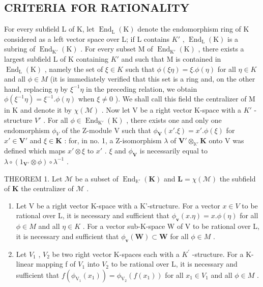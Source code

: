 \subsection{CRITERIA FOR RATIONALITY}

For every subfield L of K, let \(\operatorname{End}_{\mathrm{L}}(\mathrm{K})\) denote the endomorphism ring of K considered as a left vector space over L; if L contains \(K'\) , \(\operatorname{End}_{\mathrm{L}}(\mathrm{K})\) is a subring of \(\operatorname{End}_{\mathrm{K}'}(\mathrm{K})\) . For every subset M of \(\operatorname{End}_{\mathrm{K}'}(\mathrm{K})\) , there exists a largest subfield L of K containing \(K'\) and such that M is contained in \(\operatorname{End}_{\mathrm{L}}(\mathrm{K})\) , namely the set of \(\xi \in K\) such that \(\phi(\xi\eta) = \xi.\phi(\eta)\) for all \(\eta \in K\) and all \(\phi \in M\) (it is immediately verified that this set is a ring and, on the other hand, replacing \(\eta\) by \(\xi^{-1}\eta\) in the preceding relation, we obtain \(\phi(\xi^{-1}\eta) = \xi^{-1}.\phi(\eta)\) when \(\xi \neq 0\) ). We shall call this field the centralizer of M in K and denote it by \(\chi(\mathcal{M})\) . Now let V be a right vector K-space with a \(K'\) -structure \(V'\) . For all \(\phi \in \operatorname{End}_{\mathrm{K}'}(\mathrm{K})\) , there exists one and only one endomorphism \(\phi_{V}\) of the Z-module V such that \(\phi_{\mathbf{V}}(x'.\xi) = x'.\phi(\xi)\) for \(x' \in \mathbf{V}'\) and \(\xi \in \mathbf{K}\) : for, in no. 1, a Z-isomorphism \(\lambda\) of \(\mathbf{V}' \otimes_{\mathbb{K}'} \mathbf{K}\) onto V was defined which maps \(x' \otimes \xi\) to \(x'\) . \(\xi\) and \(\phi_{\mathbf{V}}\) is necessarily equal to \(\lambda \circ (1_{\mathbf{V}'} \otimes \phi) \circ \lambda^{-1}\) .

THEOREM 1. Let \(\mathcal{M}\) be a subset of \(\operatorname{End}_{\mathbb{K}'}(\mathbf{K})\) and \(\mathbf{L} = \chi(\mathcal{M})\) the subfield of \(\mathbf{K}\) the centralizer of \(\mathcal{M}\) .

\begin{enumerate}
\def\labelenumi{(\roman{enumi})}
\item
  Let V be a right vector K-space with a K'-structure. For a vector \(x \in V\) to be rational over L, it is necessary and sufficient that \(\phi_{\mathbf{v}}(x.\eta) = x.\phi(\eta)\) for all \(\phi \in M\) and all \(\eta \in K\) . For a vector sub-K-space W of V to be rational over L, it is necessary and sufficient that \(\phi_{\mathbf{v}}(\mathbf{W}) \subset \mathbf{W}\) for all \(\phi \in M\) .
\item
  Let \(V_{1}\) , \(V_{2}\) be two right vector K-spaces each with a \(K^{\prime}\) -structure. For a K-linear mapping f of \(V_{1}\) into \(V_{2}\) to be rational over L, it is necessary and sufficient that \(f(\phi_{\mathrm{V}_{1}}(x_{1})) = \phi_{\mathrm{V}_{2}}(f(x_{1}))\) for all \(x_{1} \in V_{1}\) and all \(\phi \in M\) .
\end{enumerate}

